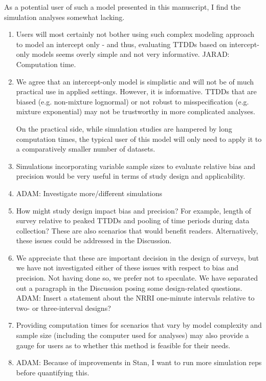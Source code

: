 \documentclass[12pt]{article}
\renewenvironment{quote}  %
              {\list{}{\rightmargin\leftmargin}\normalfont%
               \item\relax}
              {\endlist}
\newcommand{\adam}[1]{{\color{blue} ADAM: #1}}
\newcommand{\jarad}[1]{{\color{Orange} JARAD: #1}}
\begin{document}
As a potential user of such a model presented in this manuscript, I find the simulation analyses somewhat lacking.   
\begin{enumerate}
\item Users will most certainly not bother using such complex modeling approach to model an intercept only - and thus, evaluating TTDDs based on intercept-only models seems overly simple and not very informative. \jarad{Computation time.}
\begin{quote}
We agree that an intercept-only model is simplistic and will not be of much practical use in applied settings.
However, it is informative.
TTDDs that are biased (e.g. non-mixture lognormal) or not robust to misspecification (e.g. mixture exponential) may not be trustworthy in more complicated analyses.

On the practical side, while simulation studies are hampered by long computation times, the typical user of this model will only need to apply it to a comparatively smaller number of datasets.
\end{quote}
\item Simulations incorporating variable sample sizes to evaluate relative bias and precision would be very useful in terms of study design and applicability.  
\begin{quote}
\adam{Investigate more/different simulations}
\end{quote}

\item How might study design impact bias and precision?  For example, length of survey relative to peaked TTDDs and pooling of time periods during data collection?  These are also scenarios that would benefit readers.  Alternatively, these issues could be addressed in the Discussion.
\begin{quote}
We appreciate that these are important decision in the design of surveys, but we have not investigated either of these issues with respect to bias and precision.
Not having done so, we prefer not to speculate.
We have separated out a paragraph in the Discussion posing some design-related questions.
\adam{Insert a statement about the NRRI one-minute intervals relative to two- or three-interval designs?}
\end{quote}

\item Providing computation times for scenarios that vary by model complexity and sample size (including the computer used for analyses) may also provide a gauge for users as to whether this method is feasible for their needs.
\begin{quote}
\adam{Because of improvements in Stan, I want to run more simulation reps before quantifying this.}
\end{quote}


\end{enumerate}
\end{document}
